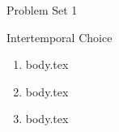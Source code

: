 \documentclass{handout}
\begin{document}
\centerline{\Large Problem Set 1}
\centerline{\large Intertemporal Choice}

\begin{enumerate}

\item {body.tex}

\item {body.tex}

\item {body.tex}

\end{enumerate}


\end{document}
